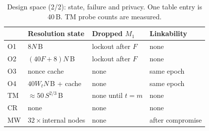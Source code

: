\begin{table}[t]
\centering
\caption{Design space (2/2): state, failure and privacy. One table entry is 40\,B. TM probe counts are measured.}
\label{tab:design2}
\scriptsize
\setlength{\tabcolsep}{3pt}
\begin{tabular}{@{}l l l l@{}}
\toprule
 & Resolution state & Dropped $M_1$ & Linkability \\
\midrule
O1 & $8N$\,B & lockout after $F$ & none \\
O2 & $(40F+8)N$\,B & lockout after $F$ & none \\
O3 & nonce cache & none & same epoch \\
O4 & $40W_tN$\,B + cache & none & same epoch \\
TM & $\approx50\,S^{2/3}$\,B & none until $t=m$ & none \\
CR & none & none & none \\
MW & $32\times$internal nodes & none & after compromise \\
\bottomrule
\end{tabular}
\end{table}

